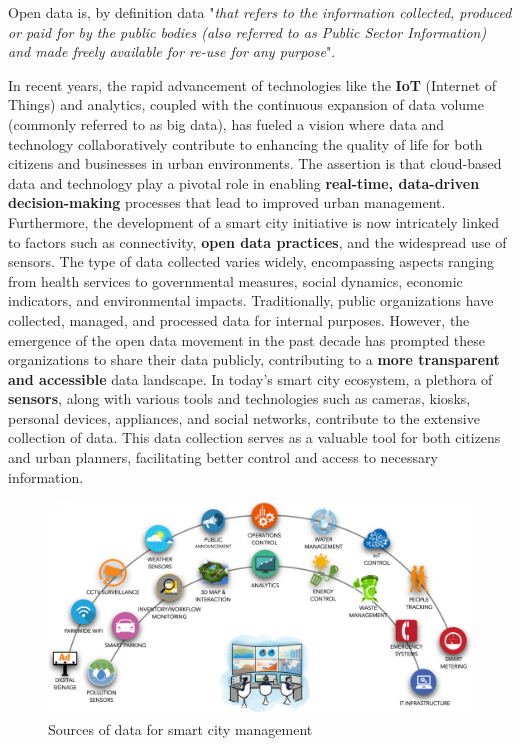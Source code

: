 Open data is, by definition \cite{dataEuropa} data "\textit{that refers to the information collected, produced or paid for by the public bodies (also referred to as Public Sector Information) and made freely available for re-use for any purpose}".

In recent years, the rapid advancement of technologies like the \textbf{IoT} (Internet of Things) and analytics, coupled with the continuous expansion of data volume (commonly referred to as big data), has fueled a vision where data and technology collaboratively contribute to enhancing the quality of life for both citizens and businesses in urban environments. The assertion is that cloud-based data and technology play a pivotal role in enabling \textbf{real-time, data-driven decision-making} processes that lead to improved urban management. Furthermore, the development of a smart city initiative is now intricately linked to factors such as connectivity, \textbf{open data practices}, and the widespread use of sensors. The type of data collected varies widely, encompassing aspects ranging from health services to governmental measures, social dynamics, economic indicators, and environmental impacts. Traditionally, public organizations have collected, managed, and processed data for internal purposes. However, the emergence of the open data movement in the past decade has prompted these organizations to share their data publicly, contributing to a \textbf{more transparent and accessible} data landscape.
In today's smart city ecosystem, a plethora of \textbf{sensors}, along with various tools and technologies such as cameras, kiosks, personal devices, appliances, and social networks, contribute to the extensive collection of data. This data collection serves as a valuable tool for both citizens and urban planners, facilitating better control and access to necessary information.
\begin{figure}
\centering
\includegraphics[width=0.9\columnwidth]{images/SmartCity.png}
\caption{Sources of data for smart city management \cite{figureSourcesofData}}
\end{figure}
